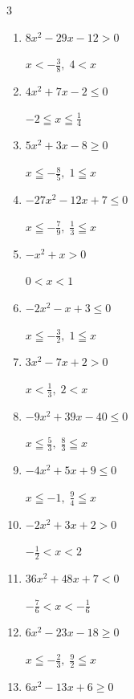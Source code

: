 \begin{multicols}{3}
\begin{enumerate}
  \item $8x^{2}-29x-12>0$

        $\displaystyle x < -\frac{3}{8} , \; 4 < x$

  \item $4x^{2}+7x-2\leq 0$

        $\displaystyle -2 \leqq x \leqq \frac{1}{4}$

  \item $5x^{2}+3x-8\geq 0$

        $\displaystyle x \leqq -\frac{8}{5} , \; 1 \leqq x$

  \item $-27x^{2}-12x+7\leq 0$

        $\displaystyle x \leqq -\frac{7}{9} , \; \frac{1}{3} \leqq x$

  \item $-x^{2}+x>0$

        $\displaystyle 0 < x < 1$

  \item $-2x^{2}-x+3\leq 0$

        $\displaystyle x \leqq -\frac{3}{2} , \; 1 \leqq x$

\columnbreak %

  \item $3x^{2}-7x+2>0$

        $\displaystyle x < \frac{1}{3} , \; 2 < x$

  \item $-9x^{2}+39x-40\leq 0$

        $\displaystyle x \leqq \frac{5}{3} , \; \frac{8}{3} \leqq x$

  \item $-4x^{2}+5x+9\leq 0$

        $\displaystyle x \leqq -1 , \; \frac{9}{4} \leqq x$

  \item $-2x^{2}+3x+2>0$

        $\displaystyle -\frac{1}{2} < x < 2$

  \item $36x^{2}+48x+7<0$

        $\displaystyle -\frac{7}{6} < x < -\frac{1}{6}$

  \item $6x^{2}-23x-18\geq 0$

        $\displaystyle x \leqq -\frac{2}{3} , \; \frac{9}{2} \leqq x$

  \item $6x^{2}-13x+6\geq 0$


\end{enumerate}
\end{multicols}
